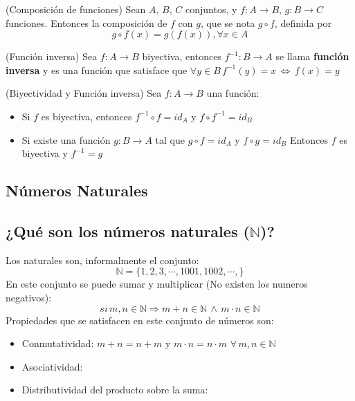 \documentclass[10pt]{article}
\begin{document}
\begin{defi}(Composición de funciones)
Sean $A$, $B$, $C$ conjuntos, y $f: A \rightarrow B$, $g: B \rightarrow C$ funciones. Entonces la composición de $f$ con $g$, que se nota $g \circ f$, definida por  
$$g \circ f(x) = g\left( f(x)\right), \forall x \in A$$
\end{defi}

\begin{defi}(Función inversa)
Sea $f : A \rightarrow B$ biyectiva, entonces $f^{-1} : B \rightarrow A$ se llama \textbf{función inversa} y es una función que satisface que $\forall y \in B \, f^{-1}(y)=x \, \Leftrightarrow \, f(x)=y$
\end{defi}
\begin{propo}(Biyectividad y Función inversa)
Sea $f : A \rightarrow B$ una función:
\begin{itemize}
	\item Si $f$ es biyectiva, entonces $f^{-1} \circ f = id_{A}$ y $f \circ f^{-1} = id_{B}$
	\item Si existe una función $g : B \rightarrow A$ tal que $g \circ f = id_{A}$ y  $f \circ g = id_{B}$
	Entonces $f$ es biyectiva y $f^{-1} = g$
\end{itemize}
\end{propo}

\begin{center}
 \section{Números Naturales}
 \subsection{¿Qué son los números naturales ($\mathbb{N}$)?}
\end{center}

Los naturales son, informalmente el conjunto:
$$\mathbb{N} = \{1,2,3, \cdots , 1001, 1002, \cdots, \}$$
En este conjunto se puede sumar y multiplicar (No existen los numeros negativos):
$$si \, m,n \in \mathbb{N} \Rightarrow m+n \in \mathbb{N} \, \land \, m \cdot n \in \mathbb{N}$$
Propiedades que se satisfacen en este conjunto de números son:
\begin{itemize}
	\item Conmutatividad: $m+n = n+m$ y $m \cdot n = n \cdot m$ $\forall \, m,n \in \mathbb{N}$
	\item Asociatividad:
	\item Distributividad del producto sobre la suma:
\end{itemize}
\end{document}
